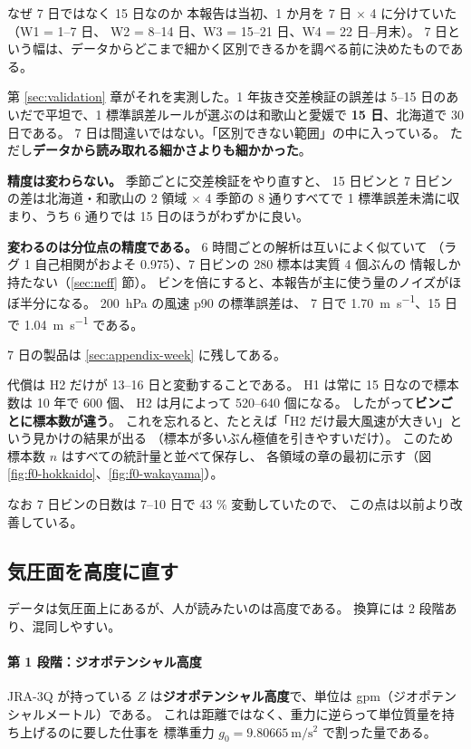 \begin{whybox}{なぜ 7 日ではなく 15 日なのか}
本報告は当初、1 か月を 7 日 $\times$ 4 に分けていた（W1 = 1--7 日、
W2 = 8--14 日、W3 = 15--21 日、W4 = 22 日--月末）。
7 日という幅は、データからどこまで細かく区別できるかを調べる前に決めたものである。

第 \ref{sec:validation} 章がそれを実測した。1 年抜き交差検証の誤差は
\numrange{5}{15} 日のあいだで平坦で、1 標準誤差ルールが選ぶのは和歌山と愛媛で
\textbf{15 日}、北海道で 30 日である。
7 日は間違いではない。「区別できない範囲」の中に入っている。
ただし\textbf{データから読み取れる細かさよりも細かかった}。

\textbf{精度は変わらない。} 季節ごとに交差検証をやり直すと、
15 日ビンと 7 日ビンの差は北海道・和歌山の 2 領域 $\times$ 4 季節の 8 通りすべてで
1 標準誤差未満に収まり、うち 6 通りでは 15 日のほうがわずかに良い。

\textbf{変わるのは分位点の精度である。} 6 時間ごとの解析は互いによく似ていて
（ラグ 1 自己相関がおよそ 0.975）、7 日ビンの 280 標本は実質 4 個ぶんの
情報しか持たない（\ref{sec:neff} 節）。
ビンを倍にすると、本報告が主に使う量のノイズがほぼ半分になる。
\SI{200}{\hecto\pascal} の風速 p90 の標準誤差は、
7 日で \SI{1.70}{\metre\per\second}、15 日で \SI{1.04}{\metre\per\second} である。

7 日の製品は \ref{sec:appendix-week} に残してある。
\end{whybox}

代償は H2 だけが 13--16 日と変動することである。
H1 は常に 15 日なので標本数は 10 年で 600 個、
H2 は月によって 520--640 個になる。
したがって\textbf{ビンごとに標本数が違う}。
これを忘れると、たとえば「H2 だけ最大風速が大きい」という見かけの結果が出る
（標本が多いぶん極値を引きやすいだけ）。
このため標本数 $n$ はすべての統計量と並べて保存し、
各領域の章の最初に示す（図\ref{fig:f0-hokkaido}、\ref{fig:f0-wakayama}）。

なお 7 日ビンの日数は 7--10 日で 43 \% 変動していたので、
この点は以前より改善している。

\subsection{気圧面を高度に直す}
\label{sec:altitude}

データは気圧面上にあるが、人が読みたいのは高度である。
換算には 2 段階あり、混同しやすい。

\paragraph{第 1 段階：ジオポテンシャル高度}
JRA-3Q が持っている $Z$ は\textbf{ジオポテンシャル高度}で、単位は gpm（ジオポテンシャルメートル）である。
これは距離ではなく、重力に逆らって単位質量を持ち上げるのに要した仕事を
標準重力 $g_0 = \SI{9.80665}{\metre\per\second\squared}$ で割った量である。

